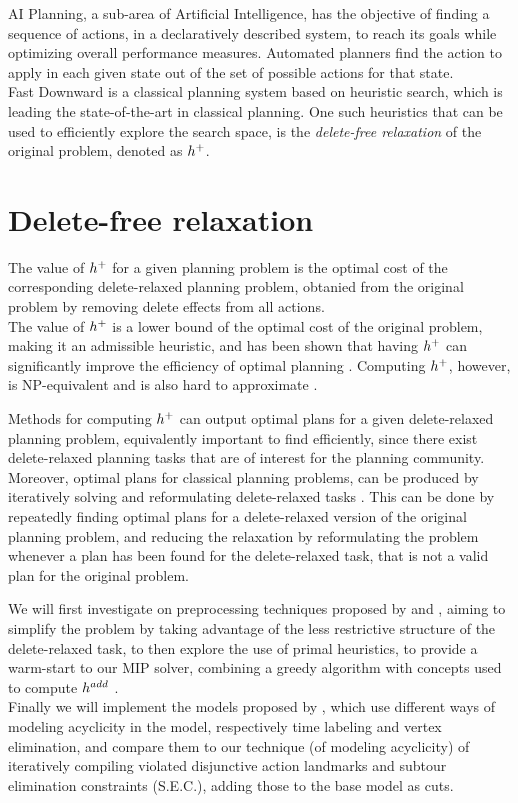 AI Planning, a sub-area of Artificial Intelligence, has the objective of finding a sequence of actions, in a declaratively described system, to reach its goals while optimizing overall performance measures. Automated planners find the action to apply in each given state out of the set of possible actions for that state.\\
Fast Downward \cite{Helmert_06} is a classical planning system based on heuristic search, which is leading the state-of-the-art in classical planning. One such heuristics that can be used to efficiently explore the search space, is the \textit{delete-free relaxation} of the original problem, denoted as $h^+$.

\section{Delete-free relaxation}
The value of $h^+$ for a given planning problem is the optimal cost of the corresponding delete-relaxed planning problem, obtanied from the original problem by removing delete effects from all actions.\\
The value of $h^+$ is a lower bound of the optimal cost of the original problem, making it an admissible heuristic, and has been shown that having $h^+$ can significantly improve the efficiency of optimal planning \cite{Helmert_09}. Computing $h^+$, however, is NP-equivalent \cite{Bylander_94} and is also hard to approximate \cite{Helmert_09}.

Methods for computing $h^+$ can output optimal plans for a given delete-relaxed planning problem, equivalently important to find efficiently, since there exist delete-relaxed planning tasks that are of interest for the planning community. Moreover, optimal plans for classical planning problems, can be produced by iteratively solving and reformulating delete-relaxed tasks \cite{LB_Haslum_12}. This can be done by repeatedly finding optimal plans for a delete-relaxed version of the original planning problem, and reducing the relaxation by reformulating the problem whenever a plan has been found for the delete-relaxed task, that is not a valid plan for the original problem.

We will first investigate on preprocessing techniques proposed by \cite{Imai_15} and \cite{MLM_Haslum_12}, aiming to simplify the problem by taking advantage of the less restrictive structure of the delete-relaxed task, to then explore the use of primal heuristics, to provide a warm-start to our MIP solver, combining a greedy algorithm with concepts used to compute $h^{add}$ \cite{Bonet_01}.\\
Finally we will implement the models proposed by \cite{Imai_15, Rankooh_22}, which use different ways of modeling acyclicity in the model, respectively time labeling and vertex elimination, and compare them to our technique (of modeling acyclicity) of iteratively compiling violated disjunctive action landmarks \cite{MLM_Haslum_12, Bonet_11} and subtour elimination constraints (S.E.C.), adding those to the base model as cuts.

